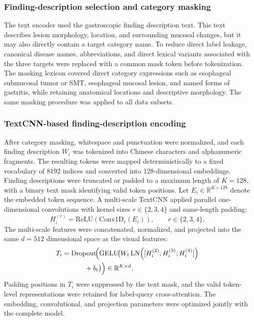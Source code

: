 \documentclass[Afour,sagev,times]{sagej}
\begin{document}
\subsubsection{Finding-description selection and category masking}

The text encoder used the gastroscopic finding description text. This text describes lesion morphology, location, and surrounding mucosal changes, but it may also directly contain a target category name. To reduce direct label leakage, canonical disease names, abbreviations, and direct lexical variants associated with the three targets were replaced with a common mask token before tokenization. The masking lexicon covered direct category expressions such as esophageal submucosal tumor or SMT, esophageal mucosal lesion, and named forms of gastritis, while retaining anatomical locations and descriptive morphology. The same masking procedure was applied to all data subsets.

\subsubsection{TextCNN-based finding-description encoding}

After category masking, whitespace and punctuation were normalized, and each finding description $W_i$ was tokenized into Chinese characters and alphanumeric fragments. The resulting tokens were mapped deterministically to a fixed vocabulary of 8192 indices and converted into 128-dimensional embeddings. Finding descriptions were truncated or padded to a maximum length of $K=128$, with a binary text mask identifying valid token positions. Let $E_i\in\mathbb{R}^{K\times128}$ denote the embedded token sequence. A multi-scale TextCNN applied parallel one-dimensional convolutions with kernel sizes $r\in\{2,3,4\}$ and same-length padding:
\begin{equation}
H_i^{(r)}=\mathrm{ReLU}\!\left(\mathrm{Conv1D}_{r}(E_i)\right),
\qquad r\in\{2,3,4\}.
\end{equation}
The multi-scale features were concatenated, normalized, and projected into the same $d=512$ dimensional space as the visual features:
\begin{equation}
\begin{aligned}
T_i={}&\mathrm{Dropout}\!\Bigl(\mathrm{GELU}\!\bigl(
W_t\,\mathrm{LN}\!\left([H_i^{(2)};H_i^{(3)};H_i^{(4)}]\right)\\
&\qquad+b_t\bigr)\Bigr)\in\mathbb{R}^{K\times d}.
\end{aligned}
\end{equation}
Padding positions in $T_i$ were suppressed by the text mask, and the valid token-level representations were retained for label-query cross-attention. The embedding, convolutional, and projection parameters were optimized jointly with the complete model.
\end{document}
